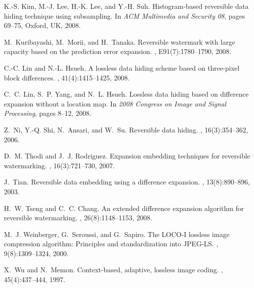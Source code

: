\documentclass{sig-alternate}
\begin{document}
\begin{thebibliography}{10}
K.-S. Kim, M.-J. Lee, H.-K. Lee, and Y.-H. Suh.
\newblock Histogram-based reversible data hiding technique using subsampling.
\newblock In {\em ACM Multimedia and Security 08}, pages 69--75, Oxford, UK,
  2008.

M.~Kuribayashi, M.~Morii, and H.~Tanaka.
\newblock Reversible watermark with large capacity based on the prediction
  error expansion.
, E91(7):1780--1790, 2008.

C.-C. Lin and N.-L. Hsueh.
\newblock A lossless data hiding scheme based on three-pixel block differences.
, 41(4):1415--1425, 2008.

C.~C. Lin, S.~P. Yang, and N.~L. Hsueh.
\newblock Lossless data hiding based on difference expansion without a location
  map.
\newblock In {\em 2008 Congress on Image and Signal Processing}, pages 8--12,
  2008.

Z.~Ni, Y.-Q. Shi, N.~Ansari, and W.~Su.
\newblock Reversible data hiding.
,
  16(3):354--362, 2006.

D.~M. Thodi and J.~J. Rodriguez.
\newblock Expansion embedding techniques for reversible watermarking.
, 16(3):721--730, 2007.

J.~Tian.
\newblock Reversible data embedding using a difference expansion.
,
  13(8):890--896, 2003.

H.~W. Tseng and C.~C. Chang.
\newblock An extended difference expansion algorithm for reversible
  watermarking.
, 26(8):1148--1153, 2008.

M.~J. Weinberger, G.~Seroussi, and G.~Sapiro.
\newblock The \uppercase{LOCO-I} lossless image compression algorithm:
  Principles and standardization into \uppercase{JPEG-LS}.
, 9(8):1309--1324, 2000.

X.~Wu and N.~Memon.
\newblock Context-based, adaptive, lossless image coding.
, 45(4):437--444, 1997.

\end{thebibliography}
\end{document}
